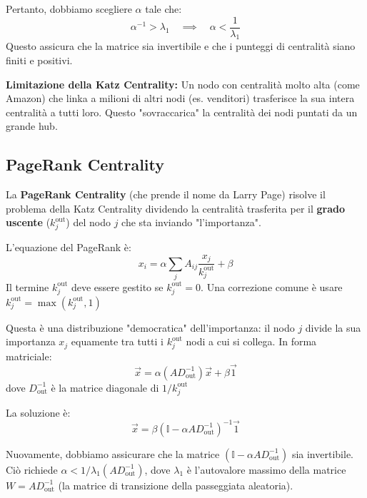	Pertanto, dobbiamo scegliere $\alpha$ tale che:
	\begin{equation}
	    \alpha^{-1} > \lambda_1 \quad \implies \quad \alpha < \frac{1}{\lambda_1}
	\end{equation}
	Questo assicura che la matrice sia invertibile e che i punteggi di centralità siano finiti e positivi. 
    
\hfill

    \noindent \textbf{Limitazione della Katz Centrality:} Un nodo con centralità molto alta (come Amazon) che linka a milioni di altri nodi (es. venditori) trasferisce la sua intera centralità a tutti loro. Questo "sovraccarica" la centralità dei nodi puntati da un grande hub.
	
	\subsection{PageRank Centrality}
	La \textbf{PageRank Centrality} (che prende il nome da Larry Page) risolve il problema della Katz Centrality dividendo la centralità trasferita per il \textbf{grado uscente} ($k_j^{\text{out}}$) del nodo $j$ che sta inviando "l'importanza".
	
	L'equazione del PageRank è:
    \begin{equation}
        x_i = \alpha \sum_{j} A_{ij} \frac{x_j}{k_j^{\text{out}}} + \beta
    \end{equation}
	Il termine $k_j^{\text{out}}$ deve essere gestito se $k_j^{\text{out}} = 0$. Una correzione comune è usare $k_j^{\text{out}} = \max(k_j^{\text{out}}, 1)$
	
	\noindent Questa è una distribuzione "democratica" dell'importanza: il nodo $j$ divide la sua importanza $x_j$ equamente tra tutti i $k_j^{\text{out}}$ nodi a cui si collega.
	In forma matriciale:
    \begin{equation}
        \vec{x} = \alpha (A D_{\text{out}}^{-1}) \vec{x} + \beta \vec{1}
    \end{equation}
	dove $D_{\text{out}}^{-1}$ è la matrice diagonale di $1/k_j^{\text{out}}$
	
	La soluzione è:
	\begin{equation}
	    \vec{x} = \beta (\mathbb{I} - \alpha A D_{\text{out}}^{-1})^{-1} \vec{1}
	\end{equation}
	
	Nuovamente, dobbiamo assicurare che la matrice $(\mathbb{I} - \alpha A D_{\text{out}}^{-1})$ sia invertibile.
	Ciò richiede $\alpha < 1/\lambda_1(A D_{\text{out}}^{-1})$, dove $\lambda_1$ è l'autovalore massimo della matrice $W = A D_{\text{out}}^{-1}$ (la matrice di transizione della passeggiata aleatoria).
	
